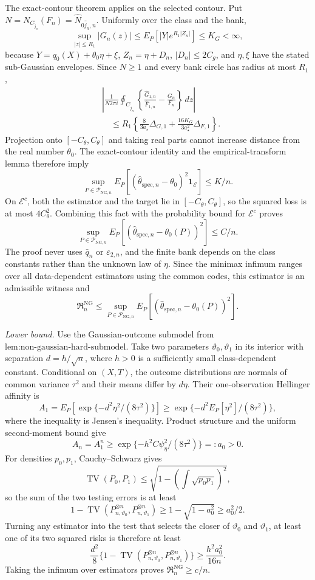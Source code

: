 The exact-contour theorem applies on the selected contour.  Put \(N=N_{C_{\widehat j_n}}(F_n)=\widehat N_{0\widehat j_n,n}\).  Uniformly over the class and the bank,
\[
 \sup_{|z|\le R_1}|G_n(z)|
 \le E_P[|Y|e^{R_1|Z_n|}]\le K_G<\infty,
\]
because \(Y=q_0(X)+\theta_0\eta+\xi\), \(Z_n=\eta+D_n\), \(|D_n|\le2C_g\), and \(\eta,\xi\) have the stated sub-Gaussian envelopes.  Since \(N\ge1\) and every bank circle has radius at most \(R_1\),
\[
 \begin{aligned}
 &\left|\frac{1}{N2\pi i}\oint_{C_{\widehat j_n}}
 \left\{\frac{\widehat G_{1,n}}{\widehat F_{1,n}}-
 \frac{G_n}{F_n}\right\}\,dz\right|\\
 &\quad\le R_1\left\{
 \frac{8}{3a_{\star}}\Delta_{G,1}
 +\frac{16K_G}{3a_{\star}^{2}}\Delta_{F,1}
 \right\}.
\end{aligned}
\]
Projection onto \([-C_{\theta},C_{\theta}]\) and taking real parts cannot increase distance from the real number \(\theta_0\).  The exact-contour identity and the empirical-transform lemma therefore imply
\[
 \sup_{P\in\mathcal P_{\mathrm{NG},n}}
 E_P[(\widehat\theta_{\mathrm{spec},n}-\theta_0)^2\mathbf 1_{\mathcal E}]
 \le K/n.
\]
On \(\mathcal E^c\), both the estimator and the target lie in \([-C_{\theta},C_{\theta}]\), so the squared loss is at most \(4C_{\theta}^2\).  Combining this fact with the probability bound for \(\mathcal E^c\) proves
\[
 \sup_{P\in\mathcal P_{\mathrm{NG},n}}
 E_P[(\widehat\theta_{\mathrm{spec},n}-\theta_0(P))^2]
 \le C/n.
\]
The proof never uses \(\bar q_n\) or \(\varepsilon_{2,n}\), and the finite bank depends on the class constants rather than the unknown law of \(\eta\).  Since the minimax infimum ranges over all data-dependent estimators using the common codes, this estimator is an admissible witness and
\[
 \mathfrak R_n^{\mathrm{NG}}
 \le \sup_{P\in\mathcal P_{\mathrm{NG},n}}
 E_P[(\widehat\theta_{\mathrm{spec},n}-\theta_0(P))^2].
\]

\emph{Lower bound.}
Use the Gaussian-outcome submodel from \(\text{lem:non-gaussian-hard-submodel}\).  Take two parameters \(\vartheta_0,\vartheta_1\) in its interior with separation \(d=h/\sqrt n\), where \(h>0\) is a sufficiently small class-dependent constant.  Conditional on \((X,T)\), the outcome distributions are normals of common variance \(\tau^2\) and their means differ by \(d\eta\).  Their one-observation Hellinger affinity is
\[
 A_1=E_P\!\left[\exp\{-d^2\eta^2/(8\tau^2)\}\right]
 \ge\exp\{-d^2E_P[\eta^2]/(8\tau^2)\},
\]
where the inequality is Jensen's inequality.  Product structure and the uniform second-moment bound give
\[
 A_n=A_1^n\ge\exp\{-h^2C\psi_{\eta}^2/(8\tau^2)\}=:a_0>0.
\]
For densities \(p_0,p_1\), Cauchy--Schwarz gives
\[
 \operatorname{TV}(P_0,P_1)
 \le\sqrt{1-\left(\int\sqrt{p_0p_1}\right)^2},
\]
so the sum of the two testing errors is at least
\[
 1-\operatorname{TV}(P_{n,\vartheta_0}^{\otimes n},P_{n,\vartheta_1}^{\otimes n})
 \ge1-\sqrt{1-a_0^2}\ge a_0^2/2.
\]
Turning any estimator into the test that selects the closer of \(\vartheta_0\) and \(\vartheta_1\), at least one of its two squared risks is therefore at least
\[
 \frac{d^2}{8}\{1-\operatorname{TV}(P_{n,\vartheta_0}^{\otimes n},P_{n,\vartheta_1}^{\otimes n})\}
 \ge \frac{h^2a_0^2}{16n}.
\]
Taking the infimum over estimators proves \(\mathfrak R_n^{\mathrm{NG}}\ge c/n\).

